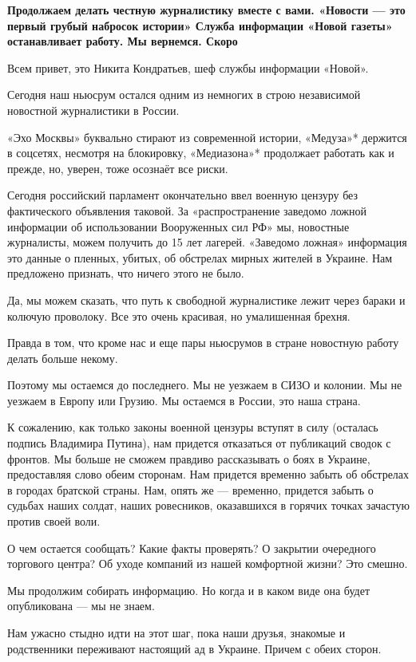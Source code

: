 {
\begin{center}
    \Large \bf
    Продолжаем делать честную журналистику вместе с вами.
    «Новости — это первый грубый набросок истории» Служба информации «Новой газеты» останавливает работу. Мы вернемся. Скоро
\end{center}
}

Всем привет, это Никита Кондратьев, шеф службы информации «Новой».

Сегодня наш ньюсрум остался одним из немногих в строю независимой новостной журналистики в России.

«Эхо Москвы» буквально стирают из современной истории, «Медуза»* держится в соцсетях, несмотря на блокировку, «Медиазона»* продолжает работать как и прежде, но, уверен, тоже осознаёт все риски.

Сегодня российский парламент окончательно ввел военную цензуру без фактического объявления таковой. За «распространение заведомо ложной информации об использовании Вооруженных сил РФ» мы, новостные журналисты, можем получить до 15 лет лагерей. «Заведомо ложная» информация это данные о пленных, убитых, об обстрелах мирных жителей в Украине. Нам предложено признать, что ничего этого не было.

Да, мы можем сказать, что путь к свободной журналистике лежит через бараки и колючую проволоку. Все это очень красивая, но умалишенная брехня.

Правда в том, что кроме нас и еще пары ньюсрумов в стране новостную работу делать больше некому.

Поэтому мы остаемся до последнего. Мы не уезжаем в СИЗО и колонии. Мы не уезжаем в Европу или Грузию. Мы остаемся в России, это наша страна.

К сожалению, как только законы военной цензуры вступят в силу (осталась подпись Владимира Путина), нам придется отказаться от публикаций сводок с фронтов. Мы больше не сможем правдиво рассказывать о боях в Украине, предоставляя слово обеим сторонам. Нам придется временно забыть об обстрелах в городах братской страны. Нам, опять же — временно, придется забыть о судьбах наших солдат, наших ровесников, оказавшихся в горячих точках зачастую против своей воли.

О чем остается сообщать? Какие факты проверять? О закрытии очередного торгового центра? Об уходе компаний из нашей комфортной жизни? Это смешно.

Мы продолжим собирать информацию. Но когда и в каком виде она будет опубликована — мы не знаем.

Нам ужасно стыдно идти на этот шаг, пока наши друзья, знакомые и родственники переживают настоящий ад в Украине. Причем с обеих сторон.


